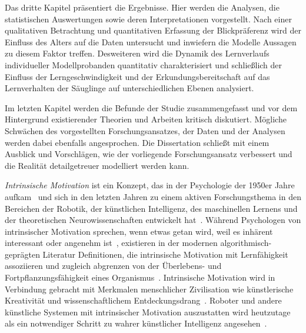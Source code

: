 \documentclass[a4paper]{scrreprt}
\begin{document}
Das dritte Kapitel pr\"asentiert die Ergebnisse. Hier werden die Analysen, die statistischen Auswertungen sowie deren Interpretationen vorgestellt. Nach einer qualitativen Betrachtung und quantitativen Erfassung der Blickpr\"aferenz wird der Einfluss des Alters auf die Daten untersucht und inwiefern die Modelle Aussagen zu diesem Faktor treffen. Desweiteren wird die Dynamik des Lernverlaufs individueller Modellprobanden quantitativ charakterisiert und schlie\ss lich der Einfluss der Lerngeschwindigkeit und der Erkundungsbereitschaft auf das Lernverhalten der S\"auglinge auf unterschiedlichen Ebenen analysiert.

Im letzten Kapitel werden die Befunde der Studie zusammengefasst und vor dem Hintergrund existierender Theorien und Arbeiten kritisch diskutiert. M\"ogliche Schw\"achen des vorgestellten Forschungsansatzes, der Daten und der Analysen werden dabei ebenfalls angesprochen. Die Dissertation schlie\ss t mit einem Ausblick und Vorschl\"agen, wie der vorliegende Forschungsansatz verbessert und die Realit\"at detailgetreuer modelliert werden kann.

\quad

\textit{Intrinsische Motivation} ist ein Konzept, das in der Psychologie der 1950er Jahre aufkam~\cite{harlow50,harlow50b,berlyne54,white59} und sich in den letzten Jahren zu einem aktiven Forschungsthema in den Bereichen der Robotik, der k\"unstlichen Intelligenz, des maschinellen Lernens und der theoretischen Neurowissenschaften entwickelt hat~\cite{baldassarre13}. W\"ahrend Psychologen von intrinsischer Motivation sprechen, wenn etwas getan wird, weil es inh\"arent interessant oder angenehm ist~\cite{ryan00b}, existieren in der modernen algorithmisch-gepr\"agten Literatur Definitionen, die intrinsische Motivation mit Lernf\"ahigkeit assoziieren und zugleich abgrenzen von der \"Uberlebens- und Fortpflanzungsf\"ahigkeit eines Organismus~\cite{mirolli13}. Intrinsische Motivation wird in Verbindung gebracht mit Merkmalen menschlicher Zivilisation wie k\"unstlerische Kreativit\"at und wissenschaftlichem Entdeckungsdrang~\cite{ryan00,schmidhuber10}. Roboter und andere k\"unstliche Systemen mit intrinsischer Motivation auszustatten wird heutzutage als ein notwendiger Schritt zu wahrer k\"unstlicher Intelligenz angesehen~\cite{weng01}.
\end{document}
